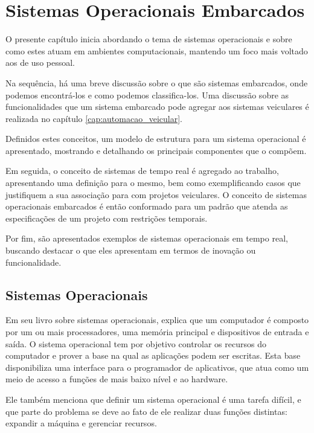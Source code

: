 \chapter{Sistemas Operacionais Embarcados}

O presente capítulo inicia abordando o tema de sistemas operacionais e sobre como estes atuam em ambientes computacionais, mantendo um foco mais voltado aos de uso pessoal.

Na sequência, há uma breve discussão sobre o que são sistemas embarcados, onde podemos encontrá-los  e como podemos classifica-los. Uma discussão sobre as funcionalidades que um sistema embarcado pode agregar aos sistemas veiculares é realizada no capítulo \ref{cap:automacao_veicular}.

Definidos estes conceitos, um modelo de estrutura para um sistema operacional é apresentado, mostrando e detalhando os principais componentes que o compõem.

Em seguida, o conceito de sistemas de tempo real é agregado ao trabalho, apresentando uma definição para o mesmo, bem como exemplificando casos que justifiquem a sua associação para com projetos veiculares. O conceito de sistemas operacionais embarcados é então conformado para um padrão que atenda as especificações de um projeto com restrições temporais.

Por fim, são apresentados exemplos de sistemas operacionais em tempo real, buscando destacar o que eles apresentam em termos de inovação ou funcionalidade.

\section{Sistemas Operacionais}

Em seu livro sobre sistemas operacionais,  explica que um computador é composto por um ou mais processadores, uma memória principal e dispositivos de entrada e saída. O sistema operacional tem por objetivo controlar os recursos do computador e prover a base na qual as aplicações podem ser escritas. Esta base disponibiliza uma interface para o programador de aplicativos, que atua como um meio de acesso a funções de mais baixo nível e ao hardware.

Ele também menciona que definir um sistema operacional é uma tarefa difícil, e que parte do problema se deve ao fato de ele realizar duas funções distintas: expandir a máquina e gerenciar recursos.

